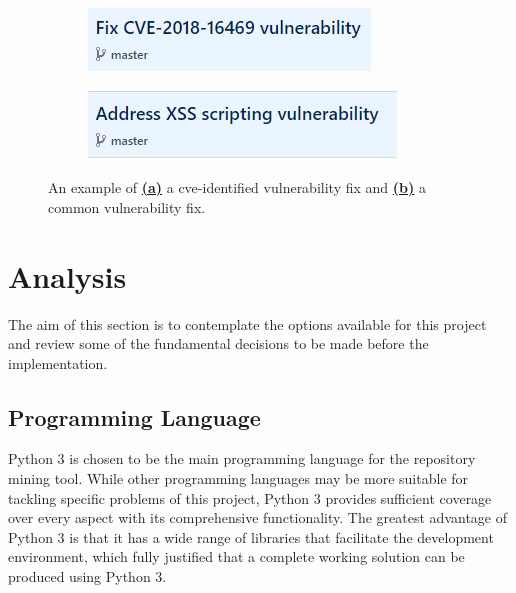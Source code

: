 \documentclass[12pt, a4paper]{report}
\begin{document}
\begin{figure}[H]
  \centering
  \begin{subfigure}{.5\textwidth}
    \centering
    \includegraphics[width=.85\textwidth]{images/cve_vuln.png}
    \label{figure:cve_vuln}
  \end{subfigure}%
  \begin{subfigure}{.5\textwidth}
    \centering
    \includegraphics[width=.85\textwidth]{images/common_vuln.png}
    \label{figure:common_vuln}
  \end{subfigure}
  \caption[A comparison between a \acrshort{cve}-identified fixing commit and a common
  vulnerability-fixing commit.]%
  {An example of \hyperref[figure:cve_vuln]{\textbf{(a)}} a \acrshort{cve}-identified vulnerability
    fix and \hyperref[figure:common_vuln]{\textbf{(b)}} a common vulnerability fix.}
  \label{figure:fig_scope}
\end{figure}

\section{Analysis}
The aim of this section is to contemplate the options available for this project and review some of
the fundamental decisions to be made before the implementation.

\subsection{Programming Language} \label{subsec:prog_lang}
Python 3 \cite{python} is chosen to be the main programming language for the repository mining tool.
While other programming languages may be more suitable for tackling specific problems of this
project, Python 3 provides sufficient coverage over every aspect with its comprehensive
functionality. The greatest advantage of Python 3 is that it has a wide range of libraries that
facilitate the development environment, which fully justified that a complete working solution can
be produced using Python 3.
\end{document}
